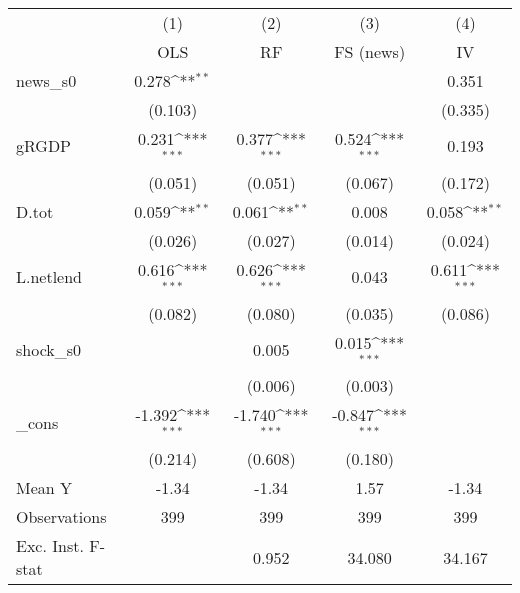 {
\def\sym#1{\ifmmode^{#1}\else\(^{#1}\)\fi}
\begin{tabular}{l*{4}{c}}
\toprule
            &\multicolumn{1}{c}{(1)}&\multicolumn{1}{c}{(2)}&\multicolumn{1}{c}{(3)}&\multicolumn{1}{c}{(4)}\\
            &\multicolumn{1}{c}{OLS}&\multicolumn{1}{c}{RF}&\multicolumn{1}{c}{FS (news)}&\multicolumn{1}{c}{IV}\\
\midrule
news\_s0     &       0.278\sym{**} &                     &                     &       0.351         \\
            &     (0.103)         &                     &                     &     (0.335)         \\
\addlinespace
gRGDP       &       0.231\sym{***}&       0.377\sym{***}&       0.524\sym{***}&       0.193         \\
            &     (0.051)         &     (0.051)         &     (0.067)         &     (0.172)         \\
\addlinespace
D.tot       &       0.059\sym{**} &       0.061\sym{**} &       0.008         &       0.058\sym{**} \\
            &     (0.026)         &     (0.027)         &     (0.014)         &     (0.024)         \\
\addlinespace
L.netlend   &       0.616\sym{***}&       0.626\sym{***}&       0.043         &       0.611\sym{***}\\
            &     (0.082)         &     (0.080)         &     (0.035)         &     (0.086)         \\
\addlinespace
shock\_s0    &                     &       0.005         &       0.015\sym{***}&                     \\
            &                     &     (0.006)         &     (0.003)         &                     \\
\addlinespace
\_cons      &      -1.392\sym{***}&      -1.740\sym{***}&      -0.847\sym{***}&                     \\
            &     (0.214)         &     (0.608)         &     (0.180)         &                     \\
\midrule
Mean Y      &       -1.34         &       -1.34         &        1.57         &       -1.34         \\
Observations&         399         &         399         &         399         &         399         \\
Exc. Inst. F-stat&                     &       0.952         &      34.080         &      34.167         \\
\bottomrule
\end{tabular}
}
